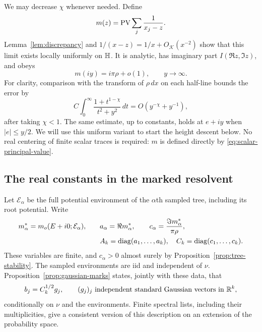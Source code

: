We may decrease $\chi$ whenever needed. Define
\begin{equation}\label{eq:scalar-principal-value}
                         m(z)=\operatorname{PV}\sum_j\frac1{x_j-z}.
\end{equation}
Lemma~\ref{lem:discrepancy} and
$1/(x-z)=1/x+O_{\mathcal K}(x^{-2})$ show that this limit exists
locally uniformly on $\mathbb H$. It is analytic, has imaginary part
$I(\Re z,\Im z)$, and obeys
\begin{equation}\label{eq:pv-initial-height}
 m(iy)=i\pi\rho+o(1),\qquad y\longrightarrow\infty.
\end{equation}
For clarity, comparison with the transform of $\rho\,dx$ on each
half-line bounds the error by
\[
 C\int_0^\infty\frac{1+t^{1-\chi}}{t^2+y^2}\,dt
                         =O(y^{-\chi}+y^{-1}),
\]
after taking $\chi<1$. The same estimate, up to constants, holds at
$e+iy$ when $|e|\le y/2$. We will use this uniform variant to start
the height descent below. No real centering of finite scalar traces
is required: $m$ is defined directly by
\eqref{eq:scalar-principal-value}.

\subsection{The real constants in the marked resolvent}

Let $\mathcal E_\alpha$ be the full potential environment of the
$\alpha$th sampled tree, including its root potential. Write
\begin{equation}\label{eq:environment-resolvent-coefficients}
 \begin{aligned}
 m_\alpha^*=m_o(E+i0;\mathcal E_\alpha),\qquad
 &a_\alpha=\Re m_\alpha^*,\qquad
 c_\alpha=\frac{\Im m_\alpha^*}{\pi\rho},\\
 &A_k=\operatorname{diag}(a_1,\ldots,a_k),\quad C_k=\operatorname{diag}(c_1,\ldots,c_k).
 \end{aligned}
\end{equation}
These variables are finite, and $c_\alpha>0$ almost surely by
Proposition~\ref{prop:tree-stability}. The sampled environments are
iid and independent of $\nu$. Proposition~\ref{prop:gaussian-marks}
states, jointly with these data, that
\begin{equation}\label{eq:independent-gaussian-residues}
 b_j=C_k^{1/2}g_j,
 \qquad (g_j)_j\text{ independent standard Gaussian vectors in }\mathbb R^k,
\end{equation}
conditionally on $\nu$ and the environments. Finite spectral lists,
including their multiplicities, give a consistent version of this
description on an extension of the probability space.

